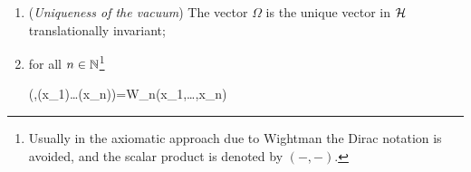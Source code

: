 \documentclass[../main/main.tex]{subfiles}
\begin{document}
\begin{theorem}
\begin{enumerate}[label=(\arabic*'), resume]
\begin{eq}
			=0 \tif \supp f\sls \supp g
		\end{eq}
		where $\sls$ denotes that the two regions are space-like separated,
		\item (\emph{Uniqueness of the vacuum}) The vector $\Omega$ is the unique vector in $\mathcal H$ translationally invariant;
		\item for all $n\in \mathbb{N}$\footnote{Usually in the axiomatic approach due to Wightman the Dirac notation is avoided, and the scalar product is denoted by $(-,-)$.}
		\begin{eq}\label{eq:reconstr_thm_prop_9}
			(\Omega,\ophi(x_1)\ldots\ophi(x_n)\Omega)=W_n(x_1,\ldots,x_n)
		\end{eq}
	\end{enumerate}
\end{theorem}
\end{document}
